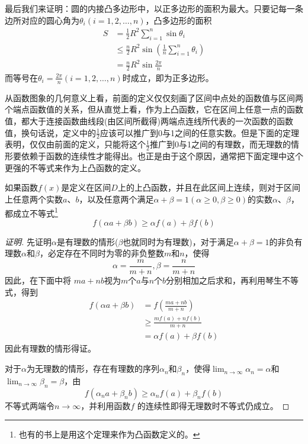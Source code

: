 最后我们来证明：圆的内接凸多边形中，以正多边形的面积为最大。只要记每一条边所对应的圆心角为$\theta_i(i=1,2,\ldots,n)$，凸多边形的面积
\begin{align*}
  S &= \frac{1}{2}R^2 \sum_{i=1}^n \sin{\theta_i} \\
& \leqslant \frac{n}{2}R^2 \sin{\left(\frac{1}{n}\sum_{i=1}^n\theta_i\right)} \\
    & =  \frac{n}{2}R^2 \sin{\frac{2\pi}{n}}
\end{align*}
而等号在$\theta_i=\frac{2\pi}{n}(i=1,2,\ldots,n)$时成立，即为正多边形。

从函数图象的几何意义上看，前面的定义仅仅刻画了区间中点处的函数值与区间两个端点函数值的关系，但从直觉上看，作为上凸函数，它在区间上任意一点的函数值，都大于连接函数曲线段(由区间所截得)两端点连线所代表的一次函数的函数值，换句话说，定义中的$\frac{1}{2}$应该可以推广到0与1之间的任意实数。但是下面的定理表明，仅仅由前面的定义，只能将这个$\frac{1}{2}$推广到0与1之间的有理数，而无理数的情形要依赖于函数的连续性才能得出。也正是由于这个原因，通常把下面定理中这个更强的不等式来作为上凸函数的定义。

\begin{theorem}
  \label{theorem:convexity-function-with-weight}
  如果函数$f(x)$是定义在区间$D$上的上凸函数，并且在此区间上连续，则对于区间上任意两个实数$a$、$b$，以及任意两个满足$\alpha + \beta = 1(\alpha \geqslant 0, \beta \geqslant 0)$的实数$\alpha$、$\beta$，都成立不等式\footnote{也有的书上是用这个定理来作为凸函数定义的。}
  \begin{equation}
    \label{eq:convexity-function-with-weight}
    f(\alpha a + \beta b) \geqslant \alpha f(a) + \beta f(b) 
  \end{equation}
\end{theorem}

\begin{proof}[证明]
  先证明$\alpha$是有理数的情形($\beta$也就同时为有理数)，对于满足$\alpha+\beta=1$的非负有理数$\alpha$和$\beta$，必定存在不同时为零的非负整数$m$和$n$，使得
  \begin{equation*}
    \alpha = \frac{m}{m+n}, \beta = \frac{n}{m+n}
  \end{equation*}
因此，在下面中将 $ma+nb$视为$m$个$a$与$n$个$b$分别相加之后求和，再利用琴生不等式，得到
\begin{equation*}
  \begin{split}
    f(\alpha a + \beta b) & = f \left( \frac{ma+nb}{m+n} \right) \\
& \geqslant \frac{mf(a)+nf(b)}{m+n} \\
& = \alpha f(a) + \beta f(b)
  \end{split}
\end{equation*}
因此有理数的情形得证。

对于$\alpha$为无理数的情形，存在有理数的序列$\alpha_n$和$\beta_n$，使得$\lim_{n\to\infty}\alpha_n=\alpha$和$\lim_{n\to\infty}\beta_n=\beta$，由
\begin{equation*}
    f(\alpha_n a + \beta_n b) \geqslant \alpha_n f(a) + \beta_n f(b) 
\end{equation*}
不等式两端令$n\to\infty$，并利用函数$f$ 的连续性即得无理数时不等式仍成立。
\end{proof}

